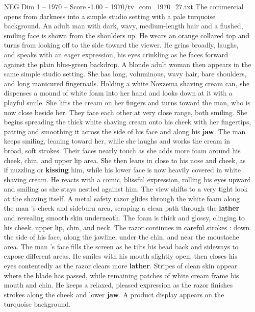 \begin{textsample}{NEG Dim 1 – 1970 – Score -1.00 – 1970/tv\_com\_1970\_27.txt}  \label{ex:f1_neg_036}
The commercial opens from darkness into a simple studio setting with a pale turquoise background.
An adult man with dark, wavy, medium-length hair and a flushed, smiling face is shown from the shoulders up.
He wears an orange collared top and turns from looking off to the side toward the viewer.
He grins broadly, laughs, and speaks with an eager expression, his eyes crinkling as he faces forward against the plain blue-green backdrop.
A blonde adult woman then appears in the same simple studio setting.
She has long, voluminous, wavy hair, bare shoulders, and long manicured fingernails.
Holding a white Noxzema shaving cream can, she dispenses a mound of white foam into her hand and looks down at it with a playful smile.
She lifts the cream on her fingers and turns toward the man, who is now close beside her.
They face each other at very close range, both smiling.
She begins spreading the thick white shaving cream onto his cheek with her fingertips, patting and smoothing it across the side of his face and along his \textbf{jaw}.
The man keeps smiling, leaning toward her, while she laughs and works the cream in broad, soft strokes.
Their faces nearly touch as she adds more foam around his cheek, chin, and upper lip area.
She then leans in close to his nose and cheek, as if nuzzling or \textbf{kissing} him, while his lower face is now heavily covered in white shaving cream.
He reacts with a comic, blissful expression, rolling his eyes upward and smiling as she stays nestled against him.
The view shifts to a very tight look at the shaving itself.
A metal safety razor glides through the white foam along the man ’s cheek and sideburn area, scraping a clean path through the \textbf{lather} and revealing smooth skin underneath.
The foam is thick and glossy, clinging to his cheek, upper lip, chin, and neck.
The razor continues in careful strokes : down the side of his face, along the jawline, under the chin, and near the moustache area.
The man ’s face fills the screen as he tilts his head back and sideways to expose different areas.
He smiles with his mouth slightly open, then closes his eyes contentedly as the razor clears more \textbf{lather}.
Stripes of clean skin appear where the blade has passed, while remaining patches of white cream frame his mouth and chin.
He keeps a relaxed, pleased expression as the razor finishes strokes along the cheek and lower \textbf{jaw}.
A product display appears on the turquoise background.

\end{textsample}
